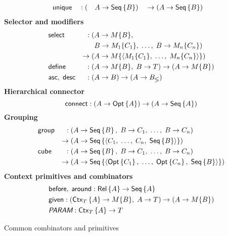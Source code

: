 \begin{table}
\begin{framed}
\begin{alignat*}{4}
        & \textup{\textsf{unique}} && : (&& A \to \textup{\textsf{Seq}}\left\{B\right\}) && \to (A \to \textup{\textsf{Seq}}\left\{B\right\})
    \end{alignat*}
    \textbf{Selector and modifiers}
    \begin{alignat*}{2}
        & \textup{\textsf{select}} & : (& A \to M\{B\}, \\
        & && B \to M_1\{C_1\},\; \ldots,\; B \to M_n\{C_n\}) \\
        & & \to (& A \to M\{\langle M_1\{C_1\},\; \ldots,\; M_n\{C_n\} \rangle\}) \\
        & \textup{\textsf{define}} & : (& A \to M\{B\},\; B \to T) \to (A \to M\{B\}) \\
        & \textup{\textsf{asc}},\; \textup{\textsf{desc}} & : (& A \to B) \to (A \to B_\lessgtr)
    \end{alignat*}
    \textbf{Hierarchical connector}
    \begin{equation*}
        \textup{\textsf{connect}} : (A \to \textup{\textsf{Opt}}\left\{A\right\}) \to (A \to \textup{\textsf{Seq}}\left\{A\right\})
    \end{equation*}
    \textbf{Grouping}
    \begin{alignat*}{2}
        & \textup{\textsf{group}} & : (& A \to \textup{\textsf{Seq}}\left\{B\right\},\; B \to C_1,\; \ldots,\; B \to C_n) \\
        & & \to (& A \to \textup{\textsf{Seq}}\left\{\langle C_1,\; \ldots,\; C_n,\; \textup{\textsf{Seq}}\left\{B\right\} \rangle\right\}) \\
        & \textup{\textsf{cube}} & : (& A \to \textup{\textsf{Seq}}\left\{B\right\},\; B \to C_1,\; \ldots,\; B \to C_n) \\
        & & \to (& A \to \textup{\textsf{Seq}}\left\{\langle \textup{\textsf{Opt}}\left\{C_1\right\},\; \ldots,\; \textup{\textsf{Opt}}\left\{C_n\right\},\; \textup{\textsf{Seq}}\left\{B\right\} \rangle\right\})
    \end{alignat*}
    \textbf{Context primitives and combinators}
    \begin{alignat*}{2}
        & \textup{\textsf{before}},\; \textup{\textsf{around}} : \textup{\textsf{Rel}}\left\{A\right\} \to \textup{\textsf{Seq}}\left\{A\right\} \\
        & \textup{\textsf{given}} : (\textup{\textsf{Ctx}}_{T}\left\{A\right\} \to M\{B\},\; A \to T) \to (A \to M\{B\}) \\
        & \textit{\textsf{PARAM}} : \textup{\textsf{Ctx}}_{T}\left\{A\right\} \to T
    \end{alignat*}
    \end{framed}
    \caption{Common combinators and primitives}
    \label{tab:common-combinators}
\end{table}

